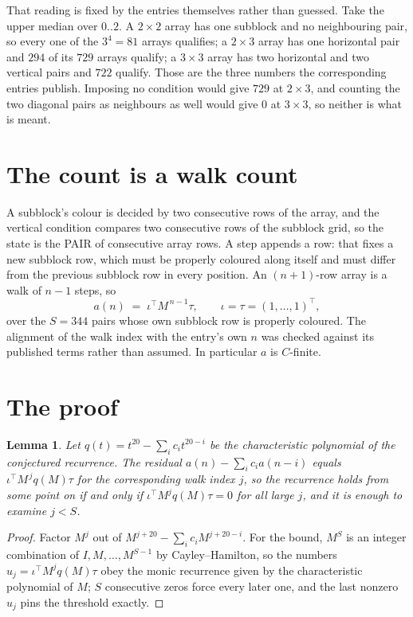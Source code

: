 \documentclass[11pt,a4paper]{article}
\theoremstyle{plain}
\newtheorem{lemma}[theorem]{Lemma}
\theoremstyle{definition}
\begin{document}
That reading is fixed by the entries themselves rather than guessed. Take the upper median
over $0..2$. A $2\times2$ array has one subblock and no neighbouring pair, so every one of the
$3^4=81$ arrays qualifies; a $2\times3$ array has one horizontal pair and $294$ of its $729$
arrays qualify; a $3\times3$ array has two horizontal and two vertical pairs and $722$
qualify. Those are the three numbers the corresponding entries publish. Imposing no condition
would give $729$ at $2\times3$, and counting the two diagonal pairs as neighbours as well
would give $0$ at $3\times3$, so neither is what is meant.

\section{The count is a walk count}

A subblock's colour is decided by two consecutive rows of the array, and
the vertical condition compares two consecutive rows of the subblock grid, so the state is the
PAIR of consecutive array rows. A step appends a row: that fixes a new subblock row, which
must be properly coloured along itself and must differ from the previous subblock row in every
position. An $(n+1)$-row array is a walk of $n-1$ steps, so
\[
a(n)\;=\;\iota^{\!\top}M^{\,n-1}\tau,\qquad\iota=\tau=(1,\dots,1)^{\!\top},
\]
over the $S=344$ pairs whose own subblock row is properly coloured.
The alignment of the walk index with the entry's own $n$ was checked against its published
terms rather than assumed. In particular $a$ is $C$-finite.

\section{The proof}

\begin{lemma}\label{lem:crit}
Let $q(t)=t^{20}-\sum_i c_it^{20-i}$ be the characteristic polynomial of the
conjectured recurrence. The residual $a(n)-\sum_ic_ia(n-i)$ equals
$\iota^{\!\top}M^{\,j}q(M)\tau$ for the corresponding walk index $j$, so the recurrence
holds from some point on if and only if $\iota^{\!\top}M^{j}q(M)\tau=0$ for all large $j$,
and it is enough to examine $j<S$.
\end{lemma}

\begin{proof}
Factor $M^{j}$ out of $M^{j+20}-\sum_ic_iM^{j+20-i}$. For the bound, $M^{S}$
is an integer combination of $I,M,\dots,M^{S-1}$ by Cayley--Hamilton, so the numbers
$u_j=\iota^{\!\top}M^{j}q(M)\tau$ obey the monic recurrence given by the characteristic
polynomial of $M$; $S$ consecutive zeros force every later one, and the last nonzero $u_j$
pins the threshold exactly.
\end{proof}
\end{document}
